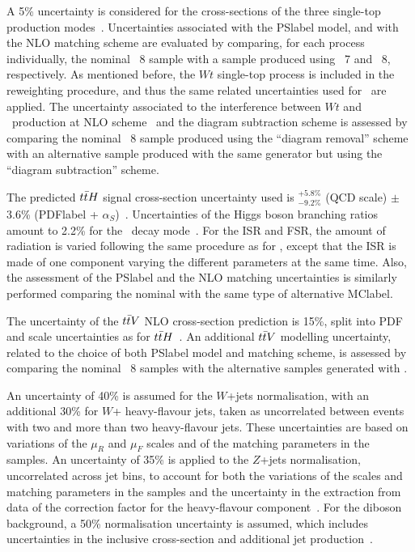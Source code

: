 A 5\% uncertainty is considered for the cross-sections of the three single-top production modes~\cite{Martin_2009,toprecomendation,Martin_2009v2,Aliev_2011,Kant_2015}. Uncertainties associated with the \acrshort{PSlabel} model, and with the NLO matching scheme are evaluated by comparing, for each process individually, the nominal \POWHEGPYTHIA~8 sample with a sample produced using \POWHEGHERWIG~7 and \MGMCatNLOPYTHIA~8, respectively. As mentioned before, the $Wt$ single-top process is included in the reweighting procedure, and thus the same related uncertainties used for \ttbar\ are applied. The uncertainty associated to the interference between $Wt$ and \ttbar\ production at NLO scheme~\cite{Frixione_2008} and the diagram
subtraction scheme is assessed by comparing the nominal \POWHEGPYTHIA~8 sample produced using the “diagram removal” scheme with an alternative sample produced with the same generator but using the “diagram subtraction” scheme.

The predicted $t\bar{t} H$ signal cross-section uncertainty used is $^{+5.8\%}_{-9.2\%}$ (QCD scale) $\pm$3.6\% (\acrshort{PDFlabel} + $\alpha_S$)~\cite{Frixione_2008,CYRM-2017-002,PhysRevD.19.941,BEENAKKER2003151,Dawson_2003,Zhang_2014,10.48550/arxiv.1504.03446}. Uncertainties of the Higgs boson branching ratios amount to 2.2\% for the \bbar\ decay mode~\cite{CYRM-2017-002}. For the ISR and FSR, the amount of radiation is varied following the same procedure as for \ttbar, except that the ISR is made of one component varying the different parameters at the same time. Also, the assessment of the \acrshort{PSlabel} and the NLO matching uncertainties is similarly performed comparing the nominal with the same type of alternative \acrshort{MClabel}.

The uncertainty of the $t\bar{t} V$ NLO cross-section prediction is 15\%, split into PDF and scale uncertainties as for $t\bar{t} H$~\cite{CYRM-2017-002,Campbell_2012}. An additional $t\bar{t} V$ modelling uncertainty, related to the choice of both \acrshort{PSlabel} model and matching scheme, is assessed by comparing the nominal \MGMCatNLOPYTHIA~8 samples with the alternative samples generated with \SHERPA.

An uncertainty of 40\% is assumed for the $W$+jets normalisation, with an additional 30\% for $W$+ heavy-flavour jets, taken as uncorrelated between events with two and more than two heavy-flavour jets. These uncertainties are based on variations of the $\mu_R$ and $\mu_F$ scales and of the matching parameters in the \SHERPA samples. An uncertainty of 35\% is applied to the $Z$+jets normalisation, uncorrelated across jet bins, to account for both the variations of the scales and matching parameters in the \SHERPA samples and the uncertainty in the extraction from data of the correction factor for the heavy-flavour
component~\cite{Ball_2015,Campbell_2012}. For the diboson background, a 50\% normalisation uncertainty is assumed, which includes uncertainties in the inclusive cross-section and additional jet production~\cite{ATL-PHYS-PUB-2016-002}.

